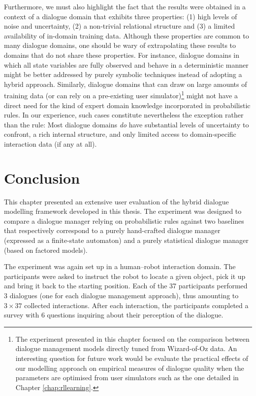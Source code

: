 Furthermore, we must also highlight the fact that the results were obtained in a context of a dialogue domain that exhibits three properties: (1) high levels of noise and uncertainty, (2) a non-trivial relational structure and (3) a limited availability of in-domain training data.  Although these properties are common to many dialogue domains, one should be wary of extrapolating these results to domains that do not share these properties.  For instance, dialogue domains in which all state variables are fully observed and behave in a deterministic manner might be better addressed by purely symbolic techniques instead of adopting a hybrid approach. Similarly, dialogue domains that can draw on large amounts of training data (or can rely on a pre-existing user simulator)\footnote{The experiment presented in this chapter focused on the comparison between dialogue management models directly tuned from Wizard-of-Oz data. An interesting question for future work would be evaluate the practical effects of our modelling approach on empirical measures of dialogue quality when the parameters are optimised from user simulators such as the one detailed in Chapter \ref{chap:rllearning}.} might not have a direct need for the kind of expert domain knowledge incorporated in probabilistic rules.   In our experience, such cases constitute nevertheless the exception rather than the rule: Most dialogue domains \textit{do} have substantial levels of uncertainty to confront, a rich internal structure, and only limited access to domain-specific interaction data (if any at all). 


\section{Conclusion}

This chapter presented an extensive user evaluation of the hybrid dialogue modelling framework developed in this thesis.  The experiment was designed to compare a dialogue manager relying on probabilistic rules against two baselines that respectively correspond to a purely hand-crafted dialogue manager (expressed as a finite-state automaton) and a purely statistical dialogue manager (based on factored models). 

The experiment was again set up in a human--robot interaction domain.  The participants were asked to instruct the robot to locate a given object, pick it up and bring it back to the starting position.  Each of the 37 participants performed 3 dialogues (one for each dialogue management approach), thus amounting to $3 \times 37$ collected interactions.  After each interaction, the participants completed a survey with 6 questions inquiring about their perception of the dialogue. 

